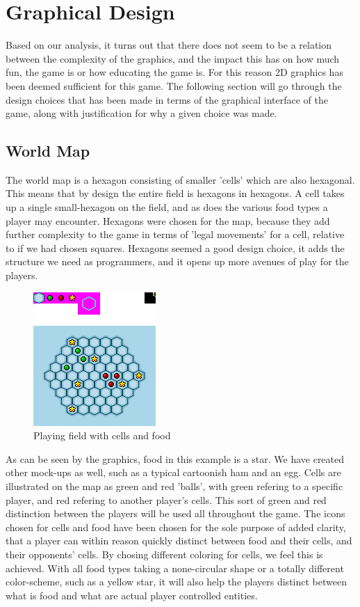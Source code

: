 \section{Graphical Design}

Based on our analysis, it turns out that there does not seem to be a relation between the complexity of the graphics, and the impact this has on how 
much fun, the game is or how educating the game is. For this reason 2D graphics has been deemed sufficient for this game. The following section will go 
through the design choices that has been made in terms of the graphical interface of the game, along with justification for why a given choice was made.

\subsection{World Map}

The world map is a hexagon consisting of smaller 'cells' which are also hexagonal. This means that by design the entire field is hexagons in hexagons. 
A cell takes up a single small-hexagon on the field, and as does the various food types a player may encounter. Hexagons were chosen for the map, 
because they add further complexity to the game in terms of 'legal movements' for a cell, relative to if we had chosen squares. Hexagons seemed a good 
design choice, it adds the structure we need as programmers, and it opens up more avenues of play for the players.


\begin{figure}[h]
	\centering
		\includegraphics{img/cells_mockup.png}
	\caption{Playing field with cells and food}
	\label{fig:cells_mockup}
\end{figure}

As can be seen by the graphics, food in this example is a star. We have created other mock-ups as well, such as a typical cartoonish ham and an egg. 
Cells are illustrated on the map as green and red 'balls', with green refering to a specific player, and red refering to another player's cells. This 
sort of green and red distinction between the players will be used all throughout the game. The icons chosen for cells and food have been chosen for 
the sole purpose of added clarity, that a player can within reason quickly distinct between food and their cells, and their opponents' cells. By 
chosing different coloring for cells, we feel this is achieved. With all food types taking a none-circular shape or a totally different color-scheme, 
such as a yellow star, it will also help the players distinct between what is food and what are actual player controlled entities.


